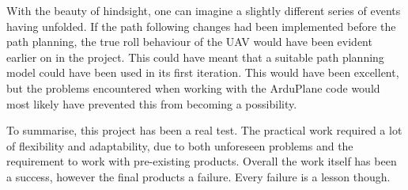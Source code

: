 With the beauty of hindsight, one can imagine a slightly different series of events having unfolded. If the path following changes had been implemented before the path planning, the true roll behaviour of the UAV would have been evident earlier on in the project. This could have meant that a suitable path planning model could have been used in its first iteration. This would have been excellent, but the problems encountered when working with the ArduPlane code would most likely have prevented this from becoming a possibility. 

To summarise, this project has been a real test. The practical work required a lot of flexibility and adaptability, due to both unforeseen problems and the requirement to work with pre-existing products. Overall the work itself has been a success, however the final products a failure. Every failure is a lesson though.